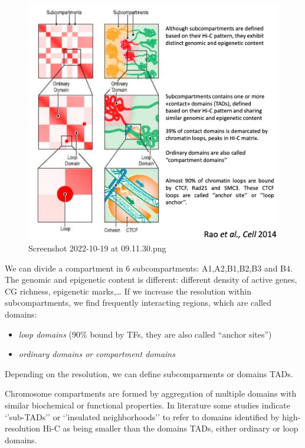 \begin{figure}
\centering
\includegraphics[width=\textwidth]{../_resources/Screenshot_2022-10-19_at_09-11-30.png}
\caption{Screenshot 2022-10-19 at 09.11.30.png}
\end{figure}

We can divide a compartment in 6 subcompartments: A1,A2,B1,B2,B3 and B4. The genomic and epigenetic content is different: different density of active genes, CG richness, epigenetic marks,\ldots{} If we increase the resolution within subcompartments, we find frequently interacting regions, which are called domains:

\begin{itemize}
\tightlist
\item
  \emph{loop domains} (90\% bound by TFs, they are also called ``anchor sites'')
\item
  \emph{ordinary domains or compartment domains}
\end{itemize}

Depending on the resolution, we can define subcomparments or domains TADs.

Chromosome compartments are formed by aggregation of multiple domains with similar biochemical or functional properties. In literature some studies indicate `'sub-TADs'' or `'insulated neighborhoods'' to refer to domains identified by high-resolution Hi-C as being smaller than the domains TADs, either ordinary or loop domains.

